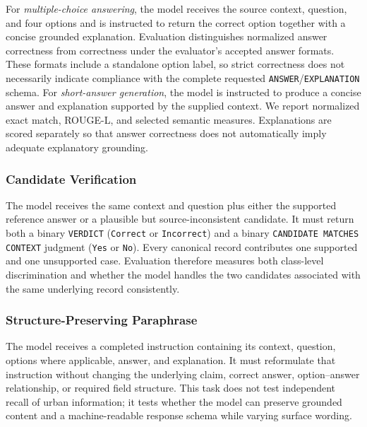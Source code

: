 \documentclass[a4paper,fleqn]{cas-sc}
\begin{document}
For \emph{multiple-choice answering}, the model receives the source context, question, and four options and is instructed to return the correct option together with a concise grounded explanation. Evaluation distinguishes normalized answer correctness from correctness under the evaluator's accepted answer formats. These formats include a standalone option label, so strict correctness does not necessarily indicate compliance with the complete requested \texttt{ANSWER}/\texttt{EXPLANATION} schema. For \emph{short-answer generation}, the model is instructed to produce a concise answer and explanation supported by the supplied context. We report normalized exact match, ROUGE-L, and selected semantic measures. Explanations are scored separately so that answer correctness does not automatically imply adequate explanatory grounding.

\subsubsection{Candidate Verification}

The model receives the same context and question plus either the supported reference answer or a plausible but source-inconsistent candidate. It must return both a binary \texttt{VERDICT} (\texttt{Correct} or \texttt{Incorrect}) and a binary \texttt{CANDIDATE MATCHES CONTEXT} judgment (\texttt{Yes} or \texttt{No}). Every canonical record contributes one supported and one unsupported case. Evaluation therefore measures both class-level discrimination and whether the model handles the two candidates associated with the same underlying record consistently.

\subsubsection{Structure-Preserving Paraphrase}

The model receives a completed instruction containing its context, question, options where applicable, answer, and explanation. It must reformulate that instruction without changing the underlying claim, correct answer, option--answer relationship, or required field structure. This task does not test independent recall of urban information; it tests whether the model can preserve grounded content and a machine-readable response schema while varying surface wording.

\end{document}
